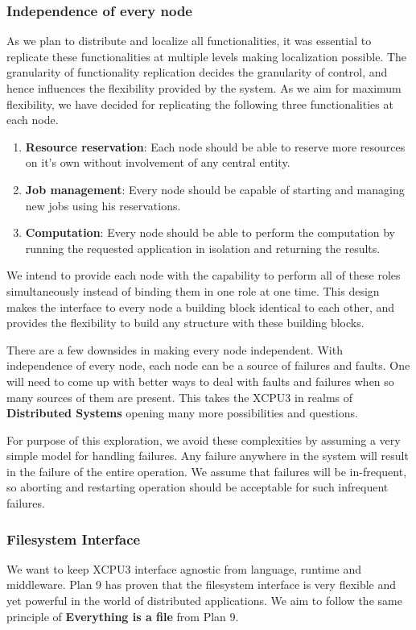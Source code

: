 \documentclass{sig-alternate}
\begin{document}
\subsubsection{Independence of every node}
As we plan to distribute and localize all functionalities, it was essential to
replicate these functionalities at multiple levels making localization
possible.  The granularity of functionality replication decides the granularity of control,
and hence influences the flexibility provided by the system.  As we aim for 
maximum flexibility, we have decided for replicating the following three
functionalities at each node.
\begin{enumerate}
\item \textbf{Resource reservation}: Each node should be able to reserve more
resources on it's own without involvement of any central entity.

\item \textbf{Job management}: Every node should be capable of starting and
managing new jobs using his reservations.

\item \textbf{Computation}: Every node should be able to perform the
computation by running the requested application in isolation and returning
the results.
\end{enumerate}

We intend to provide each node with the capability to perform all of these roles
simultaneously instead of binding them in one role at one time.  This design
makes the interface to every node a building block identical to each other, 
and provides the flexibility to build any structure with these building blocks.

There are a few downsides in making every node independent.  With independence
of every node, each node can be a source of failures and faults.
One will need to come up with better ways to deal with faults and
failures when so many sources of them are present.  This takes the XCPU3 in
realms of \textbf{Distributed Systems} opening many more possibilities and
questions.

For purpose of this exploration, we avoid these complexities by assuming a very
simple model for handling failures.  Any failure anywhere in the system will
result in the failure of the entire operation.  We assume that failures will
be in-frequent, so aborting and restarting operation should be acceptable for
such infrequent failures.

\subsubsection{Filesystem Interface}
We want to keep XCPU3 interface agnostic from language, runtime and middleware.
Plan 9 has proven that the filesystem interface is very flexible and yet
powerful in the world of distributed applications.  We aim to follow the same
principle of \textbf{Everything is a file} from Plan 9.
\end{document}
